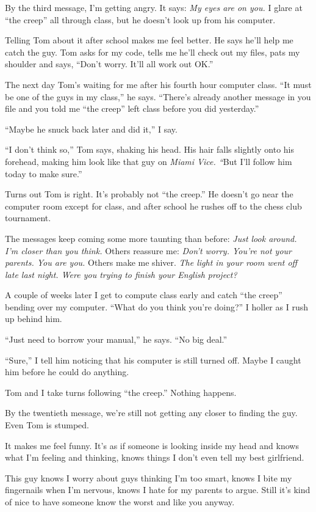 \documentclass[twoside,10pt]{book}
\begin{document}
By the third message, I'm getting angry. It says: \emph{My eyes are on
you.} I glare at ``the creep'' all through class, but he doesn't look up
from his computer.

Telling Tom about it after school makes me feel better. He says he'll
help me catch the guy. Tom asks for my code, tells me he'll check out my
files, pats my shoulder and says, ``Don't worry. It'll all work out
OK.''

The next day Tom's waiting for me after his fourth hour computer class.
``It must be one of the guys in my class,'' he says. ``There's already
another message in you file and you told me ``the creep'' left class
before you did yesterday.''

``Maybe he snuck back later and did it,'' I say.

``I don't think so,'' Tom says, shaking his head. His hair falls
slightly onto his forehead, making him look like that guy on \emph{Miami
Vice. ``}But I'll follow him today to make sure.''

Turns out Tom is right. It's probably not ``the creep.'' He doesn't go
near the computer room except for class, and after school he rushes off
to the chess club tournament.

The messages keep coming some more taunting than before: \emph{Just look
around. I'm closer than you think.} Others reassure me: \emph{Don't
worry. You're not your parents. You are you.} Others make me shiver.
\emph{The light in your room went off late last night. Were you trying
to finish your English project?}

A couple of weeks later I get to compute class early and catch ``the
creep'' bending over my computer. ``What do you think you're doing?'' I
holler as I rush up behind him.

``Just need to borrow your manual,'' he says. ``No big deal.''

``Sure,'' I tell him noticing that his computer is still turned off.
Maybe I caught him before he could do anything.

Tom and I take turns following ``the creep.'' Nothing happens.

By the twentieth message, we're still not getting any closer to finding
the guy. Even Tom is stumped.

It makes me feel funny. It's as if someone is looking inside my head and
knows what I'm feeling and thinking, knows things I don't even tell my
best girlfriend.

This guy knows I worry about guys thinking I'm too smart, knows I bite
my fingernails when I'm nervous, knows I hate for my parents to argue.
Still it's kind of nice to have someone know the worst and like you
anyway.
\end{document}

